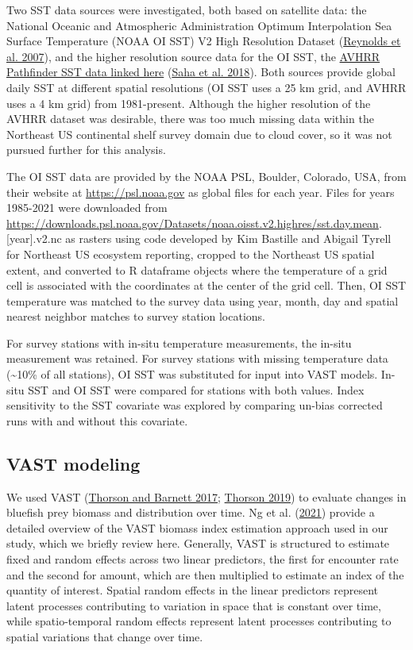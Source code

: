 \documentclass[
]{article}
\begin{document}
Two SST data sources were investigated, both based on satellite data: the National Oceanic and Atmospheric Administration Optimum Interpolation Sea Surface Temperature (NOAA OI SST) V2 High Resolution Dataset (\protect\hyperlink{ref-reynolds_daily_2007}{Reynolds et al. 2007}), and the higher resolution source data for the OI SST, the \href{https://www.ncei.noaa.gov/products/avhrr-pathfinder-sst}{AVHRR Pathfinder SST data linked here} (\protect\hyperlink{ref-saha_avhrr_2018}{Saha et al. 2018}). Both sources provide global daily SST at different spatial resolutions (OI SST uses a 25 km grid, and AVHRR uses a 4 km grid) from 1981-present. Although the higher resolution of the AVHRR dataset was desirable, there was too much missing data within the Northeast US continental shelf survey domain due to cloud cover, so it was not pursued further for this analysis.

The OI SST data are provided by the NOAA PSL, Boulder, Colorado, USA, from their website at \url{https://psl.noaa.gov} as global files for each year. Files for years 1985-2021 were downloaded from \url{https://downloads.psl.noaa.gov/Datasets/noaa.oisst.v2.highres/sst.day.mean}.{[}year{]}.v2.nc as rasters using code developed by Kim Bastille and Abigail Tyrell for Northeast US ecosystem reporting, cropped to the Northeast US spatial extent, and converted to R dataframe objects where the temperature of a grid cell is associated with the coordinates at the center of the grid cell. Then, OI SST temperature was matched to the survey data using year, month, day and spatial nearest neighbor matches to survey station locations.

For survey stations with in-situ temperature measurements, the in-situ measurement was retained. For survey stations with missing temperature data (\textasciitilde10\% of all stations), OI SST was substituted for input into VAST models. In-situ SST and OI SST were compared for stations with both values. Index sensitivity to the SST covariate was explored by comparing un-bias corrected runs with and without this covariate.

\hypertarget{vast-modeling}{%
\subsection{VAST modeling}\label{vast-modeling}}

We used VAST (\protect\hyperlink{ref-thorson_comparing_2017}{Thorson and Barnett 2017}; \protect\hyperlink{ref-thorson_guidance_2019}{Thorson 2019}) to evaluate changes in bluefish prey biomass and distribution over time. Ng et al. (\protect\hyperlink{ref-ng_predator_2021}{2021}) provide a detailed overview of the VAST biomass index estimation approach used in our study, which we briefly review here. Generally, VAST is structured to estimate fixed and random effects across two linear predictors, the first for encounter rate and the second for amount, which are then multiplied to estimate an index of the quantity of interest. Spatial random effects in the linear predictors represent latent processes contributing to variation in space that is constant over time, while spatio-temporal random effects represent latent processes contributing to spatial variations that change over time.
\end{document}
